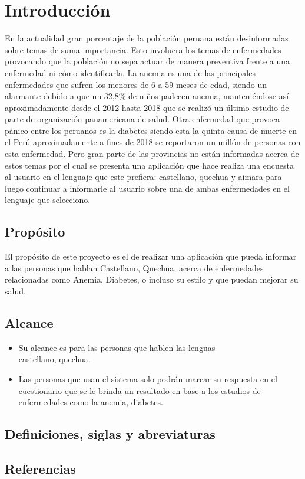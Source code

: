 \chapter{Introducción}
En la actualidad gran porcentaje de la población peruana están desinformadas sobre temas de suma importancia. Esto involucra los temas de enfermedades provocando que la población no sepa actuar de manera preventiva frente a una enfermedad ni cómo identificarla. La anemia es una de las principales enfermedades que sufren los menores de 6 a 59 meses de edad, siendo un alarmante debido a que un 32,8\% de niños padecen anemia, manteniéndose así aproximadamente desde el 2012 hasta 2018 que se realizó un último estudio de parte de organización panamericana de salud. Otra enfermedad que provoca pánico entre los peruanos es la diabetes siendo esta la quinta causa de muerte en el Perú aproximadamente a fines de 2018 se reportaron un millón de personas con esta enfermedad. Pero gran parte de las provincias no están informadas acerca de estos temas por el cual se presenta una aplicación que hace realiza una encuesta al usuario en el lenguaje que este prefiera: castellano, quechua y aimara para luego continuar a informarle al usuario sobre una de ambas enfermedades en el lenguaje que selecciono. 
\section{Propósito}
El propósito de este proyecto es el de realizar una aplicación que pueda informar a las personas que hablan Castellano, Quechua, acerca de enfermedades relacionadas como Anemia, Diabetes, o incluso su estilo y que puedan mejorar su salud.  
\section{Alcance}
\begin{itemize}
\item Su alcance es para las personas que hablen las lenguas \\castellano, quechua.
\item Las personas que usan el sistema solo podrán marcar su respuesta en el cuestionario que se le brinda un resultado en base a los estudios de enfermedades como la anemia, diabetes.

\end{itemize}
\section{Definiciones, siglas y abreviaturas}

\section{Referencias}